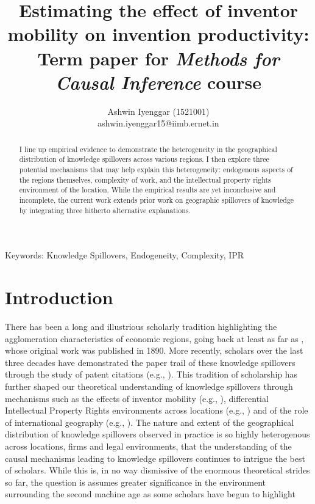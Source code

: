 \documentclass[12pt]{article}
\begin{document}
\title{\LARGE Estimating the effect of inventor mobility on  invention productivity:\\ \Large Term paper for \textit{Methods for Causal Inference} course}
\author{Ashwin Iyenggar  (1521001) \\ ashwin.iyenggar15@iimb.ernet.in} 
\large

\maketitle
\thispagestyle{empty}

\begin{abstract}
\large \noindent I line up empirical evidence to demonstrate the heterogeneity in the geographical distribution of knowledge spillovers across various regions. I then explore  three potential mechanisms that may help explain this heterogeneity: endogenous aspects of the regions themselves, complexity of work, and the intellectual property rights environment of the location. While the empirical results are yet inconclusive and incomplete, the current work extends prior work on geographic spillovers of knowledge by  integrating three hitherto alternative explanations.
\end{abstract}
{Keywords:} Knowledge Spillovers, Endogeneity, Complexity, IPR
\onehalfspacing
\section{Introduction}
There has been a long and illustrious scholarly tradition highlighting the agglomeration characteristics of economic regions, going back at least as far as \cite{Marshall1890}, whose original work was published in 1890. More recently, scholars over the last three decades have demonstrated the paper trail of these knowledge spillovers through the study of patent citations (e.g., \cite{Jaffe1993, Almeida1999}). This tradition of scholarship has further shaped our theoretical understanding of knowledge spillovers through mechanisms such as the effects of inventor mobility (e.g., \cite{Almeida1999}), differential Intellectual Property Rights environments across locations (e.g., \cite{Zhao2006}) and of the role of international geography (e.g., \cite{Singh2007}).  The nature and extent of the geographical distribution of knowledge spillovers observed  in practice is so highly heterogenous across locations, firms and legal environments,  that the understanding of the causal mechanisms leading to knowledge spillovers continues to intrigue the best of scholars. While this is, in no way dismissive of  the enormous theoretical strides so far, the question is assumes greater significance in the environment surrounding the second machine age as some scholars have begun to highlight \citep{Mcafee2014} 
\end{document}
